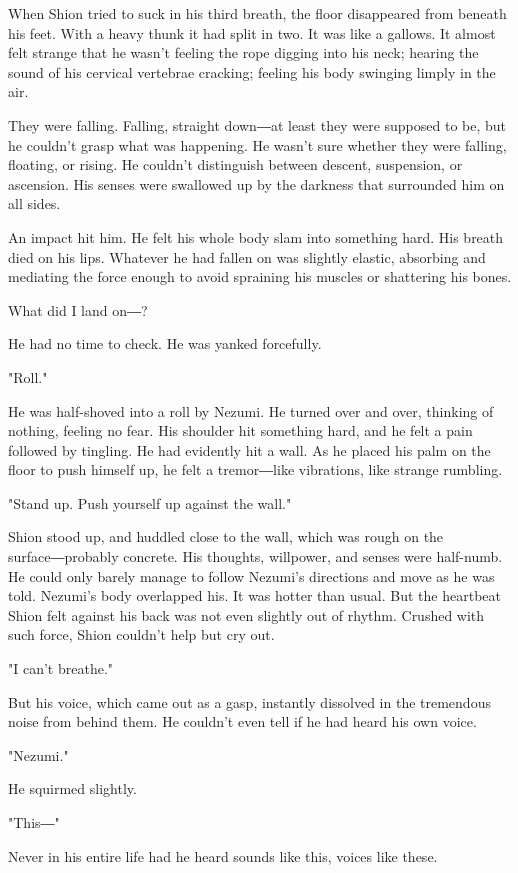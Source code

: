 When Shion tried to suck in his third breath, the floor disappeared from
beneath his feet. With a heavy thunk it had split in two. It was like a
gallows. It almost felt strange that he wasn't feeling the rope digging
into his neck; hearing the sound of his cervical vertebrae cracking;
feeling his body swinging limply in the air.

They were falling. Falling, straight down―at least they were supposed to
be, but he couldn't grasp what was happening. He wasn't sure whether
they were falling, floating, or rising. He couldn't distinguish between
descent, suspension, or ascension. His senses were swallowed up by the
darkness that surrounded him on all sides.

An impact hit him. He felt his whole body slam into something hard. His
breath died on his lips. Whatever he had fallen on was slightly elastic,
absorbing and mediating the force enough to avoid spraining his muscles
or shattering his bones.

What did I land on―?

He had no time to check. He was yanked forcefully.

"Roll."

He was half-shoved into a roll by Nezumi. He turned over and over,
thinking of nothing, feeling no fear. His shoulder hit something hard,
and he felt a pain followed by tingling. He had evidently hit a wall. As
he placed his palm on the floor to push himself up, he felt a
tremor―like vibrations, like strange rumbling.

"Stand up. Push yourself up against the wall."

Shion stood up, and huddled close to the wall, which was rough on the
surface―probably concrete. His thoughts, willpower, and senses were
half-numb. He could only barely manage to follow Nezumi's directions and
move as he was told. Nezumi's body overlapped his. It was hotter than
usual. But the heartbeat Shion felt against his back was not even
slightly out of rhythm. Crushed with such force, Shion couldn't help but
cry out.

"I can't breathe."

But his voice, which came out as a gasp, instantly dissolved in the
tremendous noise from behind them. He couldn't even tell if he had heard
his own voice.

"Nezumi."

He squirmed slightly.

"This―"

Never in his entire life had he heard sounds like this, voices like
these.

